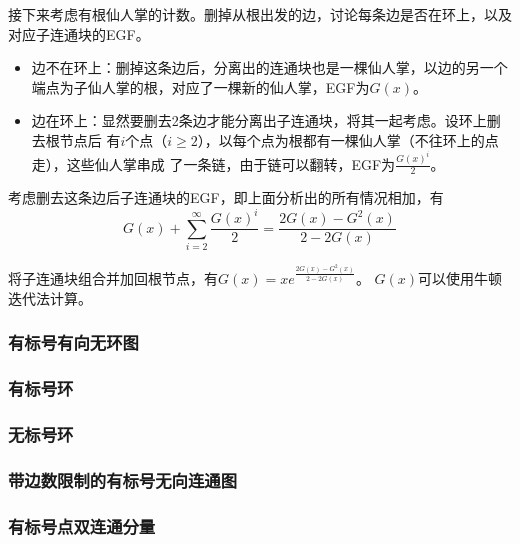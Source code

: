 接下来考虑有根仙人掌的计数。删掉从根出发的边，讨论每条边是否在环上，以及对应子连通块的EGF。
\begin{itemize}
    \item 边不在环上：删掉这条边后，分离出的连通块也是一棵仙人掌，以边的另一个
    端点为子仙人掌的根，对应了一棵新的仙人掌，EGF为$G(x)$。
    \item 边在环上：显然要删去2条边才能分离出子连通块，将其一起考虑。设环上删去根节点后
    有$i$个点（$i\geq 2$），以每个点为根都有一棵仙人掌（不往环上的点走），这些仙人掌串成
    了一条链，由于链可以翻转，EGF为$\frac{G(x)^i}{2}$。
\end{itemize}

考虑删去这条边后子连通块的EGF，即上面分析出的所有情况相加，有
\begin{displaymath}
    G(x)+\sum_{i=2}^\infty{\frac{G(x)^i}{2}}=
    \frac{2G(x)-G^2(x)}{2-2G(x)}
\end{displaymath}

将子连通块组合并加回根节点，有$G(x)=xe^{\frac{2G(x)-G^2(x)}{2-2G(x)}}$。
$G(x)$可以使用牛顿迭代法计算。
\subsubsection{有标号有向无环图}
\subsubsection{有标号环}
\subsubsection{无标号环}
\subsubsection{带边数限制的有标号无向连通图}
\subsubsection{有标号点双连通分量}
